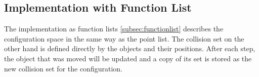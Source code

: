 %        
%        
%        
%        
%        
%        
%
%  

\subsection{Implementation with Function List}
The implementation as function lists \ref{subsec:functionlist} describes the configuration space in the same way as the point list. The collision set on the other hand is defined directly by the objects and their positions. After each step, the object that was moved will be updated and a copy of its set is stored as the new collision set for the configuration.
